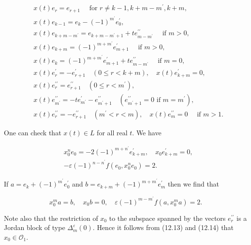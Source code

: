 \documentclass[10pt]{article}
\begin{document}
$$
\begin{aligned}
& x(t) e_{r}=e_{r+1} \quad \text { for } r \neq k-1, k+m-m^{\prime}, k+m, \\
& x(t) e_{k-1}=e_{k}-(-1)^{m^{\prime}} e_{0}^{\prime}, \\
& x(t) e_{k+m-m^{\prime}}=e_{k+m-m^{\prime}+1}+t e_{m-m^{\prime}}^{\prime \prime} \quad \text { if } m>0, \\
& x(t) e_{k+m}=(-1)^{m+m^{\prime}} e_{m+1}^{\prime} \quad \text { if } m>0, \\
& x(t) e_{k}=(-1)^{m+m^{\prime}} e_{m+1}^{\prime}+t e_{m-m^{\prime}}^{\prime \prime} \quad \text { if } m=0, \\
& x(t) e_{r}^{\prime}=-e_{r+1}^{\prime} \quad(0 \leqslant r<k+m), \quad x(t) e_{k+m}^{\prime}=0, \\
& x(t) e_{r}^{\prime \prime}=e_{r+1}^{\prime \prime} \quad\left(0 \leqslant r<m^{\prime}\right), \\
& x(t) e_{m^{\prime}}^{\prime \prime}=-t e_{m^{\prime}}^{\prime}-e_{m^{\prime}+1}^{\prime \prime} \quad\left(e_{m^{\prime}+1}^{\prime \prime}=0 \text { if } m=m^{\prime}\right), \\
& x(t) e_{r}^{\prime \prime}=-e_{r+1}^{\prime \prime} \quad\left(m^{\prime}<r<m\right), \quad x(t) e_{m}^{\prime \prime}=0 \quad \text { if } m>1 .
\end{aligned}
$$

One can check that $x(t) \in L$ for all real $t$. We have


\begin{align*}
& x_{0}^{n} e_{0}=-2(-1)^{m+n^{\prime}} e_{k+m}^{\prime}, \quad x_{0} e_{k+m}^{\prime}=0, \\
& -\varepsilon(-1)^{n-n^{\prime}} f\left(e_{0}, x_{0}^{n} e_{0}\right)=2 . \tag{12.13}
\end{align*}


If $a=e_{k}+(-1)^{m^{\prime}} e_{0}^{\prime}$ and $b=e_{k+m}+(-1)^{m+m^{\prime}} e_{m}^{\prime}$ then we find that


\begin{equation*}
x_{0}^{m} a=b, \quad x_{0} b=0, \quad \varepsilon(-1)^{m-m^{\prime}} f\left(a, x_{0}^{m} a\right)=2 . \tag{12.14}
\end{equation*}


Note also that the restriction of $x_{0}$ to the subspace spanned by the vectors $e_{r}^{\prime \prime}$ is a Jordan block of type $\Delta_{m}^{\varepsilon}(0)$. Hence it follows from (12.13) and (12.14) that $x_{0} \in \mathcal{O}_{1}$.
\end{document}
